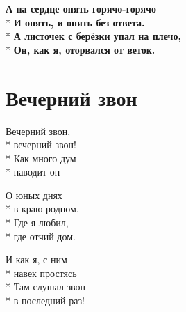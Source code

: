 \begin{minipage}{\linewidth}
\hspace*{1.5em}\textbf{А на сердце опять горячо-горячо}\\*
\hspace*{1.5em}\textbf{И опять, и опять без ответа.}\\*
\hspace*{1.5em}\textbf{А листочек с берёзки упал на плечо,}\\*
\hspace*{1.5em}\textbf{Он, как я, оторвался от веток.}\\
\end{minipage}

\vspace{\fill}\newpage

\section{Вечерний звон}
\label{song:Вечерний_звон}

\medskip

\begin{minipage}{\linewidth}
Вечерний звон,\\*
вечерний звон!\\*
Как много дум\\*
наводит он\\
\end{minipage}\par\medskip\nobreak

\medskip

\begin{minipage}{\linewidth}
О юных днях\\*
в краю родном,\\*
Где я любил,\\*
где отчий дом.\\
\end{minipage}\par\medskip\nobreak

\medskip

\begin{minipage}{\linewidth}
И как я, с ним\\*
навек простясь\\*
Там слушал звон\\*
в последний раз!\\
\end{minipage}\par\medskip\nobreak

